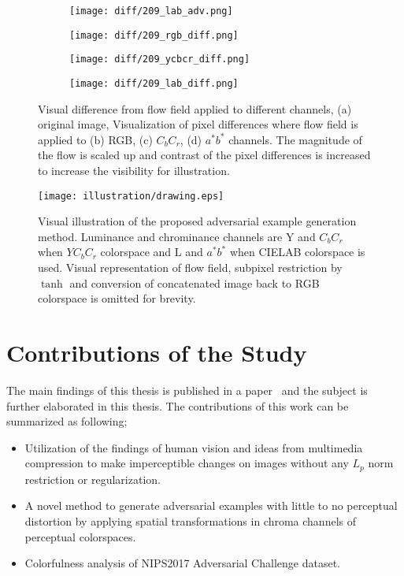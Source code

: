 \begin{figure}[t]
    \centering
    \begin{subfigure}[b]{.23\linewidth}
        \texttt{[image: diff/209\_lab\_adv.png]}
        \caption{}
    \end{subfigure}
    \begin{subfigure}[b]{.23\linewidth}
        \texttt{[image: diff/209\_rgb\_diff.png]}
        \caption{}
    \end{subfigure}
    \begin{subfigure}[b]{.23\linewidth}
        \texttt{[image: diff/209\_ycbcr\_diff.png]}
        \caption{}
    \end{subfigure}
    \begin{subfigure}[b]{.23\linewidth}
        \texttt{[image: diff/209\_lab\_diff.png]}
        \caption{}
    \end{subfigure}
    \caption{Visual difference from flow field applied to different channels, (a) original image, Visualization of pixel differences where flow field is applied to (b) RGB, (c) \(C_{b}C_{r}\), (d) \(a^*b^*\) channels. The magnitude of the flow is scaled up and contrast of the pixel differences is increased to increase the visibility for illustration. }\label{fig:diff}
\end{figure}

\begin{figure*}[t]
    \centering
    \texttt{[image: illustration/drawing.eps]}
    \caption{Visual illustration of the proposed adversarial example generation method. Luminance and chrominance channels are Y and \(C_{b}C_{r}\) when \(YC_{b}C_{r}\) colorspace and L and \(a^*b^*\) when CIELAB colorspace is used. Visual representation of flow field, subpixel restriction by \(\tanh\) and conversion of concatenated image back to RGB colorspace is omitted for brevity.}\label{fig:algorithm}
\end{figure*}

\section{Contributions of the Study}

The main findings of this thesis is published in a paper~\cite{aydin2019imperceptible} and the subject is further elaborated in this thesis. The contributions of this work can be summarized as following;
\begin{itemize}
    \item Utilization of the findings of human vision and ideas from multimedia compression to make imperceptible changes on images without any \(L_p\) norm restriction or regularization.
    \item A novel method to generate adversarial examples with little to no perceptual distortion by applying spatial transformations in chroma channels of perceptual colorspaces.
    \item Colorfulness analysis of NIPS2017 Adversarial Challenge dataset.
\end{itemize}

